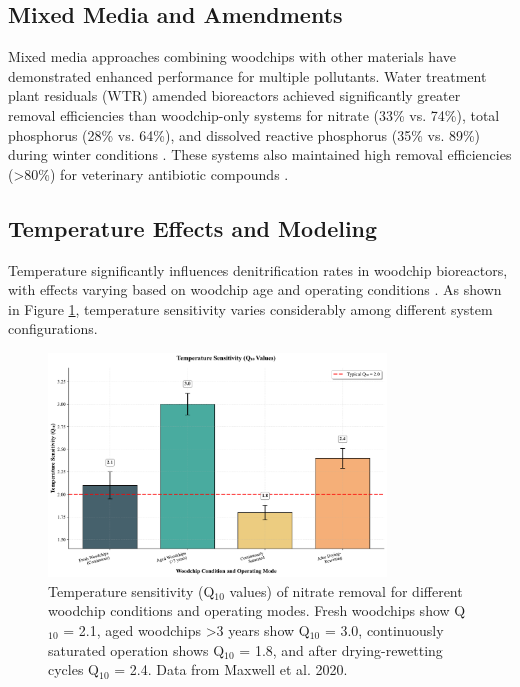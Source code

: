 \documentclass[12pt,a4paper]{article}
\begin{document}
\subsection{Mixed Media and Amendments}

Mixed media approaches combining woodchips with other materials have demonstrated enhanced performance for multiple pollutants. Water treatment plant residuals (WTR) amended bioreactors achieved significantly greater removal efficiencies than woodchip-only systems for nitrate (33\% vs. 74\%), total phosphorus (28\% vs. 64\%), and dissolved reactive phosphorus (35\% vs. 89\%) during winter conditions \citep{RN370}. These systems also maintained high removal efficiencies (>80\%) for veterinary antibiotic compounds \citep{RN370}.

\subsection{Temperature Effects and Modeling}

Temperature significantly influences denitrification rates in woodchip bioreactors, with effects varying based on woodchip age and operating conditions \citep{RN228, RN242}. As shown in Figure \ref{fig:temperature_sensitivity}, temperature sensitivity varies considerably among different system configurations.

\begin{figure}[ht]
\centering
\includegraphics[width=0.8\textwidth]{fig4_temperature_scientific}
\caption{Temperature sensitivity (Q$_{10}$ values) of nitrate removal for different woodchip conditions and operating modes. Fresh woodchips show Q$_{10}$ = 2.1, aged woodchips >3 years show Q$_{10}$ = 3.0, continuously saturated operation shows Q$_{10}$ = 1.8, and after drying-rewetting cycles Q$_{10}$ = 2.4. Data from Maxwell et al. 2020.}
\label{fig:temperature_sensitivity}
\end{figure}
\end{document}
